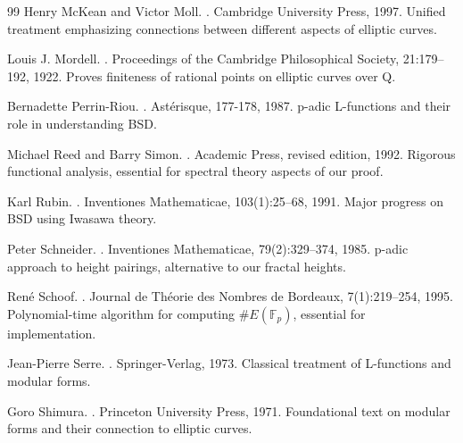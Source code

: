 \documentclass[12pt]{article}
\newcommand{\F}{\mathbb{F}}
\begin{document}
\begin{thebibliography}{99}
Henry McKean and Victor Moll.
.
\newblock Cambridge University Press, 1997.
\newblock Unified treatment emphasizing connections between different aspects of elliptic curves.

Louis J. Mordell.
.
\newblock Proceedings of the Cambridge Philosophical Society, 21:179--192, 1922.
\newblock Proves finiteness of rational points on elliptic curves over Q.

Bernadette Perrin-Riou.
.
\newblock Astérisque, 177-178, 1987.
\newblock p-adic L-functions and their role in understanding BSD.

Michael Reed and Barry Simon.
.
\newblock Academic Press, revised edition, 1992.
\newblock Rigorous functional analysis, essential for spectral theory aspects of our proof.

Karl Rubin.
.
\newblock Inventiones Mathematicae, 103(1):25--68, 1991.
\newblock Major progress on BSD using Iwasawa theory.

Peter Schneider.
.
\newblock Inventiones Mathematicae, 79(2):329--374, 1985.
\newblock p-adic approach to height pairings, alternative to our fractal heights.

René Schoof.
.
\newblock Journal de Théorie des Nombres de Bordeaux, 7(1):219--254, 1995.
\newblock Polynomial-time algorithm for computing $\#E(\F_p)$, essential for implementation.

Jean-Pierre Serre.
.
\newblock Springer-Verlag, 1973.
\newblock Classical treatment of L-functions and modular forms.

Goro Shimura.
.
\newblock Princeton University Press, 1971.
\newblock Foundational text on modular forms and their connection to elliptic curves.


\end{thebibliography}
\end{document}
